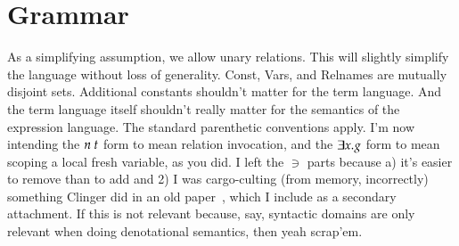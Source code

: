 \documentclass[11pt,twoside]{article}
\numberwithin{equation}{subsection} %
\begin{document}
\section{Grammar}

As a simplifying assumption, we allow unary relations. This will
slightly simplify the language without loss of generality. Const,
Vars, and Relnames are mutually disjoint sets. Additional constants
shouldn't matter for the term language. And the term language itself
shouldn't really matter for the semantics of the expression
language. The standard parenthetic conventions apply. I'm now
intending the $n\ t$ form to mean relation invocation,
and the $\exists x . g$ form to mean scoping a local fresh
variable, as you did. I left the $\ni$ parts because a) it's easier to
remove than to add and 2) I was cargo-culting (from memory,
incorrectly) something Clinger did in an old
paper~\cite{clinger1984scheme}, which I include as a secondary
attachment. If this is not relevant because, say, syntactic domains
are only relevant when doing denotational semantics, then yeah
scrap'em. \\
\end{document}
